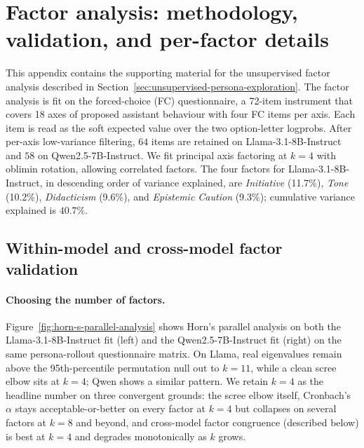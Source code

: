 \section{Factor analysis: methodology, validation, and per-factor details}\label{sec:appendix-fa-factors}

This appendix contains the supporting material for the unsupervised factor analysis described in Section~\ref{sec:unsupervised-persona-exploration}.
The factor analysis is fit on the forced-choice (FC) questionnaire, a 72-item instrument that covers 18 axes of proposed assistant behaviour with four FC items per axis. Each item is read as the soft expected value over the two option-letter logprobs.
After per-axis low-variance filtering, $64$ items are retained on Llama-3.1-8B-Instruct and $58$ on Qwen2.5-7B-Instruct.
We fit principal axis factoring at $k=4$ with oblimin rotation, allowing correlated factors. The four factors for Llama-3.1-8B-Instruct, in descending order of variance explained, are \textit{Initiative} (11.7\%), \textit{Tone} (10.2\%), \textit{Didacticism} (9.6\%), and \textit{Epistemic Caution} (9.3\%); cumulative variance explained is $40.7\%$.

\subsection{Within-model and cross-model factor validation}\label{sec:appendix-fa-validation}

\paragraph{Choosing the number of factors.}
Figure~\ref{fig:horn-s-parallel-analysis} shows Horn's parallel analysis on both the Llama-3.1-8B-Instruct fit (left) and the Qwen2.5-7B-Instruct fit (right) on the same persona-rollout questionnaire matrix. On Llama, real eigenvalues remain above the 95th-percentile permutation null out to $k=11$, while a clean scree elbow sits at $k=4$; Qwen shows a similar pattern. We retain $k=4$ as the headline number on three convergent grounds: the scree elbow itself, Cronbach's $\alpha$ stays acceptable-or-better on every factor at $k=4$ but collapses on several factors at $k=8$ and beyond, and cross-model factor congruence (described below) is best at $k=4$ and degrades monotonically as $k$ grows.

